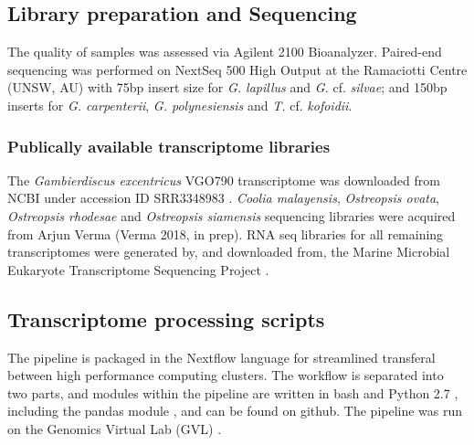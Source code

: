 \documentclass[12pt]{article}
\begin{document}
\subsection*{Library preparation and Sequencing}
The quality of samples was assessed via Agilent 2100 Bioanalyzer. 
Paired-end sequencing was performed on NextSeq 500 High Output at the Ramaciotti Centre (UNSW, AU) with 75bp insert size for \emph{G. lapillus} and \emph{G.} cf. \emph{silvae}; and 150bp inserts for \emph{G. carpenterii}, \emph{G. polynesiensis} and \emph{T.} cf. \emph{kofoidii}.

\subsubsection*{Publically available transcriptome libraries}
The \emph{Gambierdiscus excentricus} VGO790 transcriptome was downloaded from NCBI under accession ID SRR3348983 \cite{kohli2017role}. 
\textit{Coolia malayensis}, \textit{Ostreopsis ovata}, \textit{Ostreopsis rhodesae} and \textit{Ostreopsis siamensis} sequencing libraries were acquired from Arjun Verma (Verma 2018, in prep). 
RNA seq libraries for all remaining transcriptomes were generated by, and downloaded from, the Marine Microbial Eukaryote Transcriptome Sequencing Project \citep{keeling2014marine}.

\subsection*{Transcriptome processing scripts}
The pipeline is packaged in the Nextflow language \cite{nextflow} for streamlined transferal between high performance computing clusters. 
The workflow is separated into two parts, and modules within the pipeline are written in bash and Python 2.7 \cite{python}, including the pandas module \cite{pandas}, and can be found on github. 
The pipeline was run on the Genomics Virtual Lab (GVL) \cite{afgan2015genomics}.
\end{document}
